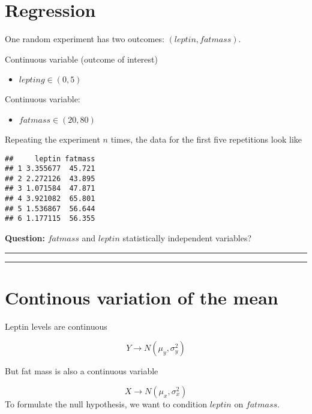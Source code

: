 \documentclass[
]{book}
\providecommand{\tightlist}{%
  \setlength{\itemsep}{0pt}\setlength{\parskip}{0pt}}
\begin{document}
\hypertarget{regression-1}{%
\section{Regression}\label{regression-1}}

One random experiment has two outcomes: \((leptin, fatmass)\).

Continuous variable (outcome of interest)

\begin{itemize}
\tightlist
\item
  \(lepting \in (0, 5)\)
\end{itemize}

Continuous variable:

\begin{itemize}
\tightlist
\item
  \(fatmass \in (20,80)\)
\end{itemize}

Repeating the experiment \(n\) times, the data for the first five repetitions look like

\begin{verbatim}
##     leptin fatmass
## 1 3.355677  45.721
## 2 2.272126  43.895
## 3 1.071584  47.871
## 4 3.921082  65.801
## 5 1.536867  56.644
## 6 1.177115  56.355
\end{verbatim}

\textbf{Question:} \(fatmass\) and \(leptin\) statistically independent variables?

\begin{center}\rule{0.5\linewidth}{0.5pt}\end{center}

\begin{center}\rule{0.5\linewidth}{0.5pt}\end{center}

\hypertarget{continous-variation-of-the-mean}{%
\section{Continous variation of the mean}\label{continous-variation-of-the-mean}}

Leptin levels are continuous

\[Y \rightarrow N(\mu_y, \sigma_{y}^2)\]

But fat mass is also a continuous variable

\[X \rightarrow N(\mu_x, \sigma_x^2)\]
To formulate the null hypothesis, we want to condition \(leptin\) on \(fatmass\).
\end{document}

